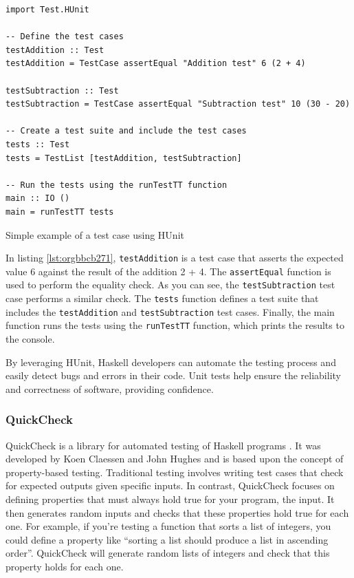 \documentclass[a4paper, titlepage, twoside]{article}
\begin{document}
\begin{listing}[htbp]
\begin{verbatim}
import Test.HUnit

-- Define the test cases
testAddition :: Test
testAddition = TestCase assertEqual "Addition test" 6 (2 + 4)

testSubtraction :: Test
testSubtraction = TestCase assertEqual "Subtraction test" 10 (30 - 20)

-- Create a test suite and include the test cases
tests :: Test
tests = TestList [testAddition, testSubtraction]

-- Run the tests using the runTestTT function
main :: IO ()
main = runTestTT tests
\end{verbatim}
\caption{\label{lst:orgbbcb271}Simple example of a test case using HUnit}
\end{listing}

In listing \ref{lst:orgbbcb271}, \texttt{testAddition} is a test case that asserts the expected value 6 against the result of the addition 2 + 4. The \texttt{assertEqual} function is used to perform the equality check. As you can see, the \texttt{testSubtraction} test case performs a similar check. The \texttt{tests} function defines a test suite that includes the \texttt{testAddition} and \texttt{testSubtraction} test cases. Finally, the main function runs the tests using the \texttt{runTestTT} function, which prints the results to the console.

By leveraging HUnit, Haskell developers can automate the testing process and easily detect bugs and errors in their code. Unit tests help ensure the reliability and correctness of software, providing confidence.

\subsubsection{QuickCheck}
\label{sec:org3811f37}

QuickCheck is a library for automated testing of Haskell programs \autocite{claessenQuickCheckAutomaticTesting}. It was developed by Koen Claessen and John Hughes and is based upon the concept of property-based testing. Traditional testing involves writing test cases that check for expected outputs given specific inputs. In contrast, QuickCheck focuses on defining properties that must always hold true for your program, the input. It then generates random inputs and checks that these properties hold true for each one. For example, if you're testing a function that sorts a list of integers, you could define a property like ``sorting a list should produce a list in ascending order''. QuickCheck will generate random lists of integers and check that this property holds for each one.
\end{document}
